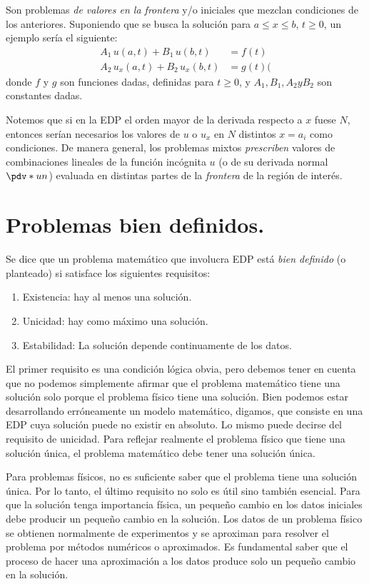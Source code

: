 Son problemas \emph{de valores en la frontera} y/o iniciales que mezclan condiciones de los anteriores. Suponiendo que se busca la solución para $a \leq x \leq b$, $t \geq 0$, un ejemplo sería el siguiente:
\begin{align}
A_{1} \, u(a, t) + B_{1} \, u(b, t) &= f(t) \label{eq:ecuacion_Z01_15} \\[0.5em]
A_{2} \, u_{x}(a, t) + B_{2} \, u_{x}(b, t) &= g(t) (\label{eq:ecuacion_Z01_16}
\end{align}
donde $f$ y $g$ son funciones dadas, definidas para $t \geq 0$, y $A_{1}, B_{1}, A_{2} y B_{2}$ son constantes dadas.
\par
Notemos que si en la EDP el orden mayor de la derivada respecto a $x$ fuese $N$, entonces serían necesarios los valores de $u$ o $u_{x}$ en $N$ distintos $x = a_{i}$ como condiciones. De manera general, los problemas mixtos \emph{prescriben} valores de combinaciones lineales de la función incógnita $u$ (o de su derivada normal $\pdv*{u}{n}$) evaluada en distintas partes de la \emph{frontera} de la región de interés.

\section{Problemas bien definidos.}

Se dice que un problema matemático que involucra EDP está \emph{bien definido} (o planteado) si satisface los siguientes requisitos:
\begin{enumerate}
\item Existencia: hay al menos una solución.
\item Unicidad: hay como máximo una solución.
\item Estabilidad: La solución depende continuamente de los datos.
\end{enumerate}

El primer requisito es una condición lógica obvia, pero debemos tener en cuenta que no podemos simplemente afirmar que el problema matemático tiene una solución solo porque el problema físico tiene una solución. Bien podemos estar desarrollando erróneamente un modelo matemático, digamos, que consiste en una EDP cuya solución puede no existir en absoluto. Lo mismo puede decirse del requisito de unicidad. Para reflejar realmente el problema físico que tiene una solución única, el problema matemático debe tener una solución única.
\par
Para problemas físicos, no es suficiente saber que el problema tiene una solución única. Por lo tanto, el último requisito no solo es útil sino también esencial. Para que la solución tenga importancia física, un pequeño cambio en los datos iniciales debe producir un pequeño cambio en la solución. Los datos de un problema físico se obtienen normalmente de experimentos y se aproximan para resolver el problema por métodos numéricos o aproximados. Es fundamental saber que el proceso de hacer una aproximación a los datos produce solo un pequeño cambio en la solución.

